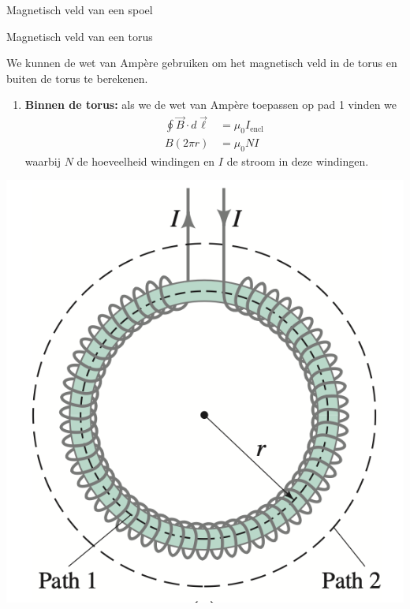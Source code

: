 \begin{app}{Magnetisch veld van een spoel}
\end{app}

\begin{app}{Magnetisch veld van een torus}
    \begin{minipage}{.73\textwidth}
        We kunnen de wet van Ampère gebruiken om het magnetisch veld in de torus en buiten de torus te berekenen.
        \begin{enumerate}
            \item \textbf{Binnen de torus:} als we de wet van Ampère toepassen op pad 1 vinden we 
            \begin{align*}
                \oint \Vec{B} \cdot d\Vec{\ell} &= \mu_{0}I_{\text{encl}} \\
                        B(2 \pi r) &= \mu_{0}NI
            \end{align*}
            waarbij $N$ de hoeveelheid windingen en $I$ de stroom in deze windingen.
        \end{enumerate}
    \end{minipage}
    \begin{minipage}{.23\textwidth}
        \vspace{-0.55cm}
        \includegraphics[scale = 0.4]{Images/Magnetisme/MagnetischVeldTorus.png}

\end{minipage}
\end{app}
